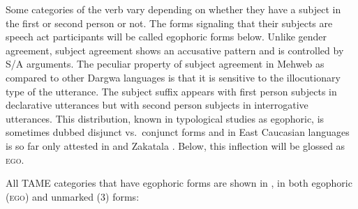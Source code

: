 \documentclass[output=paper]{langsci/langscibook}
\begin{document}

Some categories of the verb vary depending on whether they have a
subject in the first or second person or not. The forms signaling that
their subjects are speech act participants will be called egophoric
forms below. Unlike gender agreement, subject agreement shows an
accusative pattern and is controlled by S/A arguments. The peculiar
property of subject agreement in Mehweb as compared to other Dargwa
languages is that it is sensitive to the illocutionary type of the
utterance. The subject suffix appears with first person subjects in
declarative utterances but with second person subjects in interrogative
utterances. This distribution, known in typological studies as 
egophoric, is sometimes dubbed disjunct vs.\ conjunct forms 
and in East Caucasian languages is so far only attested in 
\citep{creissels2008,creissels2018} and Zakatala  \citep{forker2018}. Below, this
inflection will be glossed as \textsc{ego}.

All TAME categories that have egophoric forms are shown in , in
both egophoric (\textsc{ego}) and unmarked (3) forms:
\end{document}
